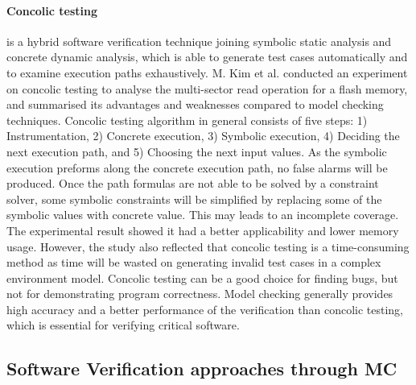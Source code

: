 \paragraph{Concolic testing} is a hybrid software verification technique joining symbolic static analysis and concrete dynamic analysis, which is able to generate test cases automatically and to examine execution paths exhaustively. M. Kim et al. \cite{Kim:2009:CTM:1693660.1693677} conducted an experiment on concolic testing to analyse the multi-sector read operation for a flash memory, and summarised its advantages and weaknesses compared to model checking techniques. Concolic testing algorithm in general consists of five steps: 1) Instrumentation, 2) Concrete execution, 3) Symbolic execution, 4) Deciding the next execution path, and 5) Choosing the next input values. As the symbolic execution preforms along the concrete execution path, no false alarms will be produced. Once the path formulas are not able to be solved by a constraint solver, some symbolic constraints will be simplified by replacing some of the symbolic values with concrete value. This may leads to an incomplete coverage. The experimental result showed it had a better applicability and lower memory usage. However, the study also reflected that concolic testing is a time-consuming method as time will be wasted on generating invalid test cases in a complex environment model. %
Concolic testing can be a good choice for finding bugs, but not for demonstrating program correctness. Model checking generally provides high accuracy and a better performance of the verification than concolic testing, which is essential for verifying critical software.

\subsection{Software Verification approaches through MC}

